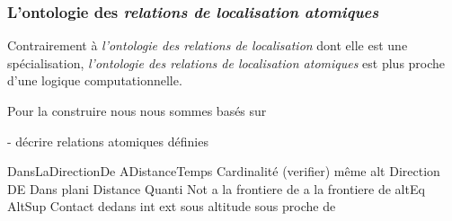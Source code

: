 \subsubsection{L'ontologie des \emph{relations de localisation atomiques}}

Contrairement à \emph{l'ontologie des relations de localisation} dont
elle est une spécialisation, \emph{l'ontologie des relations de
  localisation atomiques} est plus proche d'une logique
computationnelle.

Pour la construire nous nous sommes basés sur

- décrire relations atomiques définies

DansLaDirectionDe
ADistanceTemps
Cardinalité (verifier)
même alt
Direction DE
Dans plani
Distance Quanti
Not a la frontiere de
a la frontiere de
altEq
AltSup
Contact
dedans
int
ext
sous altitude
sous proche de 

